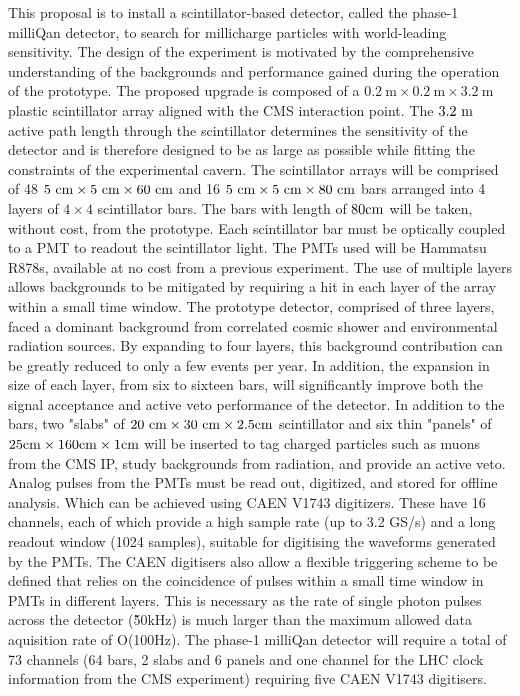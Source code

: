 \documentclass[11pt]{article}
\theoremstyle{plain} \numberwithin{equation}{section}
\theoremstyle{definition}
\begin{document}
This proposal is to install a scintillator-based detector, called the phase-1 milliQan detector, 
to search for millicharge particles with world-leading sensitivity.
The design of the experiment is motivated by 
the comprehensive understanding of the backgrounds and performance gained during the
operation of the prototype. The proposed upgrade is 
composed of a $0.2~\mathrm{m}\times0.2~\mathrm{m}\times3.2~\mathrm{m}$ plastic scintillator array aligned with 
the CMS interaction point. The $3.2~\rm{m}$ active path length through the scintillator determines the sensitivity 
of the detector and is therefore designed to be as large as possible while fitting the constraints of the experimental cavern.
The scintillator arrays will be comprised of 48 $5~\rm{cm}\times5~\rm{cm}\times60~\rm{cm}$ 
and 16 $5~\rm{cm}\times5~\rm{cm}\times80~\rm{cm}$ bars arranged into 4 layers of $4\times4$ scintillator bars. 
The bars with length of $80\rm{cm}$ will be taken, without cost, from the prototype. Each scintillator bar must be optically
coupled to a PMT to readout the scintillator light. The PMTs used will be 
Hammatsu R878s, available at no cost from a previous experiment. The use of multiple layers allows backgrounds to be mitigated
by requiring a hit in each layer of the array within a small time window. The prototype detector, comprised
of three layers, faced a dominant background from correlated cosmic shower and environmental radiation sources.
By expanding to four layers, this background contribution can be greatly reduced to only a few events per year.
In addition, the expansion in size of each layer, from six to sixteen bars, will significantly improve
both the signal acceptance and active veto performance of the detector. 
In addition to the bars, two "slabs" of $20~\rm{cm}\times30~\rm{cm}\times2.5\rm{cm}$ scintillator and 
six thin "panels" of $25\rm{cm}\times160\rm{cm}\times1\rm{cm}$ 
will be inserted to tag charged particles such as muons from the CMS IP, study backgrounds from radiation, 
and provide an active veto. Analog pulses from the PMTs must be read out,
digitized, and stored for offline analysis. Which can be achieved using CAEN V1743 digitizers. 
These have 16 channels, each of which provide a high sample rate (up to 3.2 GS/s) and a long readout window (1024 samples), 
suitable for digitising the waveforms generated by the PMTs. The CAEN digitisers also allow a flexible triggering
scheme to be defined that relies on the coincidence of pulses within a small time window in PMTs in different layers. This is necessary
as the rate of single photon pulses across the detector (\~50kHz) is much larger than the maximum allowed data aquisition rate of O(100Hz). 
The phase-1 milliQan detector will require a total of 73 channels (64 bars, 2 slabs and 6 panels and one channel
for the LHC clock information from the CMS experiment) requiring five CAEN V1743 digitisers. 
\end{document}
